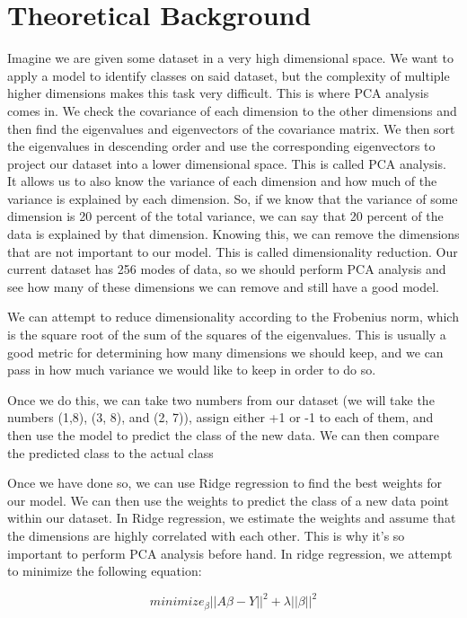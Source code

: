 \documentclass[11pt]{amsart}
\begin{document}
\section{Theoretical Background}\label{sec:theory}
Imagine we are given some dataset in a very high dimensional space. We want to apply a model to identify classes on said dataset, 
but the complexity of multiple higher dimensions makes this task very difficult. This is where PCA analysis comes in. We check the covariance 
of each dimension to the other dimensions and then find the eigenvalues and eigenvectors of the covariance matrix. We then sort the eigenvalues in 
descending order and use the corresponding eigenvectors to project our dataset into a lower dimensional space. This is called PCA analysis. It allows us 
to also know the variance of each dimension and how much of the variance is explained by each dimension. So, if we know that the variance 
of some dimension is 20 percent of the total variance, we can say that 20 percent of the data is explained by that dimension. Knowing this, we can remove 
the dimensions that are not important to our model. This is called dimensionality reduction. Our current dataset has 
256 modes of data, so we should perform PCA analysis and see how many of these dimensions we can remove and still have a good model.

We can attempt to reduce dimensionality according to the Frobenius norm, which is the square root of the sum of the squares of the eigenvalues.
This is usually a good metric for determining how many dimensions we should keep, and we can pass in how much variance we would like to keep in order to do so. 

Once we do this, we can take two numbers from our dataset (we will take the numbers (1,8), (3, 8), and (2, 7)), assign 
either +1 or -1 to each of them, and then use the model to predict the class of the new data. We can then compare the predicted class to the actual class

Once we have done so, we can use Ridge regression to find the best weights for our model. We can then use the weights to predict the class of a new
data point within our dataset. In Ridge regression, we estimate the weights and assume that the dimensions are highly correlated with each other. This is 
why it's so important to perform PCA analysis before hand. In ridge regression, we attempt to minimize the following equation:

\[minimize_\beta ||A\beta - Y||^2 + \lambda||\beta||^2\]
\end{document}
